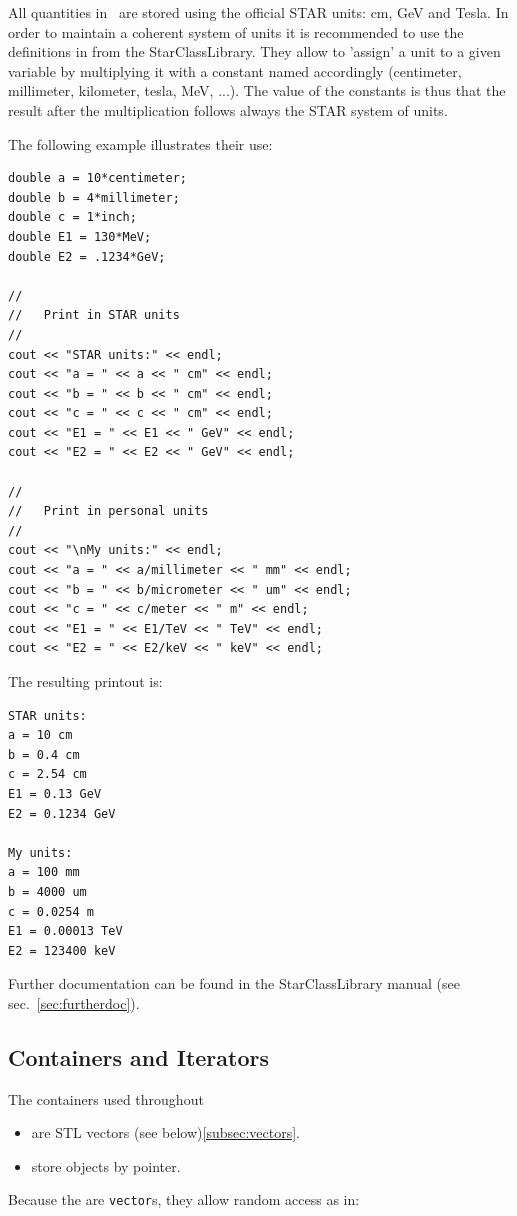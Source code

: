All quantities in \StMcEvent\ are stored using the official STAR units:
cm, GeV and Tesla.  In order to maintain a coherent system of units it
is recommended to use the definitions in  from
the StarClassLibrary. They allow to 'assign' a unit to a given
variable by multiplying it with a constant named accordingly
(centimeter, millimeter, kilometer, tesla, MeV, ...).  The value of
the constants is thus that the result after the multiplication follows
always the STAR system of units.

The following example illustrates their use:
{\footnotesize
\begin{verbatim}
double a = 10*centimeter;
double b = 4*millimeter;
double c = 1*inch;
double E1 = 130*MeV;
double E2 = .1234*GeV;

//
//   Print in STAR units
//
cout << "STAR units:" << endl;
cout << "a = " << a << " cm" << endl;
cout << "b = " << b << " cm" << endl;
cout << "c = " << c << " cm" << endl;
cout << "E1 = " << E1 << " GeV" << endl;
cout << "E2 = " << E2 << " GeV" << endl;

//
//   Print in personal units
//
cout << "\nMy units:" << endl;
cout << "a = " << a/millimeter << " mm" << endl;
cout << "b = " << b/micrometer << " um" << endl;
cout << "c = " << c/meter << " m" << endl;
cout << "E1 = " << E1/TeV << " TeV" << endl;
cout << "E2 = " << E2/keV << " keV" << endl;
\end{verbatim}
}%
The resulting printout is:
{\footnotesize
\begin{verbatim}
STAR units:
a = 10 cm
b = 0.4 cm
c = 2.54 cm
E1 = 0.13 GeV
E2 = 0.1234 GeV

My units:
a = 100 mm
b = 4000 um
c = 0.0254 m
E1 = 0.00013 TeV
E2 = 123400 keV
\end{verbatim}
}%

Further documentation can be found in the StarClassLibrary manual
(see sec.~\ref{sec:furtherdoc}).

\subsection{Containers and Iterators}
\label{sec:containers}

The containers used throughout \StMcEvent\
\begin{itemize}
  \item are STL vectors (see below)\ref{subsec:vectors}.
  \item store objects by pointer.
\end{itemize}
Because the are {\tt vector}s, they allow random access as in:

